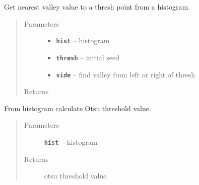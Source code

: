 \documentclass[letterpaper,10pt,english]{sphinxmanual}
\begin{document}
\begin{fulllineitems}
\label{RRtoolbox.lib.arrayops:RRtoolbox.lib.arrayops.basic.findminima}
Get nearest valley value to a thresh point from a histogram.
\begin{quote}\begin{description}
\item[{Parameters}] \leavevmode\begin{itemize}
\item {} 
\textbf{\texttt{hist}} -- histogram

\item {} 
\textbf{\texttt{thresh}} -- initial seed

\item {} 
\textbf{\texttt{side}} -- find valley from left or right of thresh

\end{itemize}

\item[{Returns}] \leavevmode


\end{description}\end{quote}

\end{fulllineitems}


\begin{fulllineitems}
\label{RRtoolbox.lib.arrayops:RRtoolbox.lib.arrayops.basic.getOtsuThresh}
From histogram calculate Otsu threshold value.
\begin{quote}\begin{description}
\item[{Parameters}] \leavevmode
\textbf{\texttt{hist}} -- histogram

\item[{Returns}] \leavevmode
otsu threshold value

\end{description}\end{quote}

\end{fulllineitems}

\end{document}
